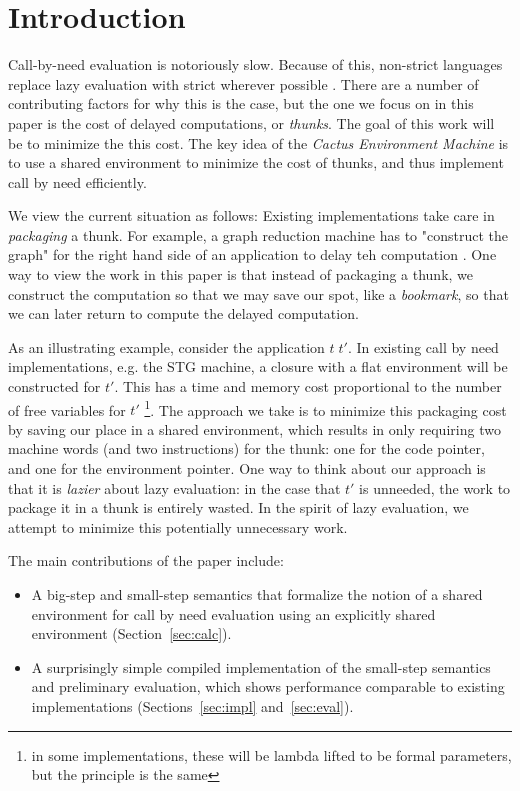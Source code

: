 \section{Introduction}

Call-by-need evaluation is notoriously slow. Because of this, non-strict
languages replace lazy evaluation with strict wherever possible \cite{?}. There
are a number of contributing factors for why this is the case, but the one we
focus on in this paper is the cost of delayed computations, or \emph{thunks}.
The goal of this work will be to minimize the this cost. The key idea of the
\emph{Cactus Environment Machine} is to use a shared environment to minimize the
cost of thunks, and thus implement call by need efficiently. 

We view the current situation as follows: Existing implementations take care in
\emph{packaging} a thunk. For example, a graph reduction machine has to
"construct the graph" for the right hand side of an application to delay teh
computation \cite{?}. One way to view the work in this paper is that instead of
packaging a thunk, we construct the computation so that we may save our spot,
like a \emph{bookmark}, so that we can later return to compute the delayed
computation. 

As an illustrating example, consider the application $t \; t'$. In existing call
by need implementations, e.g. the STG machine, a closure with a flat environment
will be constructed for $t'$.  This has a time and memory cost proportional to
the number of free variables for $t'$ \footnote{in some implementations, these
will be lambda lifted to be formal parameters, but the principle is the same}.
The approach we take is to minimize this packaging cost by saving our place in a
shared environment, which results in only requiring two machine words (and two
instructions) for the thunk: one for the code pointer, and one for the
environment pointer. One way to think about our approach is that it is
\emph{lazier} about lazy evaluation: in the case that $t'$ is unneeded, the work
to package it in a thunk is entirely wasted. In the spirit of lazy evaluation,
we attempt to minimize this potentially unnecessary work.  

The main contributions of the paper include:
\begin{itemize}
\item A big-step and small-step semantics that formalize the notion of a shared
environment for call by need evaluation using an explicitly shared environment
(Section~\ref{sec:calc}).
\item A surprisingly simple compiled implementation of the small-step semantics
and preliminary evaluation, which shows performance comparable to existing
implementations (Sections~\ref{sec:impl} and~\ref{sec:eval}).
\end{itemize}

